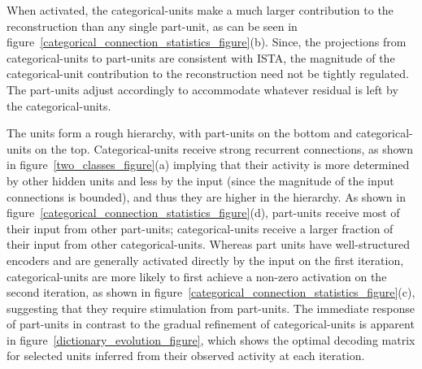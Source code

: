 \documentclass{article} %
\begin{document}
When activated, the categorical-units make a much larger contribution to the reconstruction than any single part-unit, as can be seen in figure~\ref{categorical_connection_statistics_figure}(b).  Since, the projections from categorical-units to part-units are consistent with ISTA, the magnitude of the categorical-unit contribution to the reconstruction need not be tightly regulated.  The part-units adjust accordingly to accommodate whatever residual is left by the categorical-units.

The units form a rough hierarchy, with part-units on the bottom and categorical-units on the top.  
Categorical-units receive strong recurrent connections, as shown in figure~\ref{two_classes_figure}(a) implying that their activity is more determined by other hidden units and less by the input (since the magnitude of the input connections is bounded), and thus they are higher in the hierarchy.  
As shown in figure~\ref{categorical_connection_statistics_figure}(d), part-units receive most of their input from other part-units; categorical-units receive a larger fraction of their input from other categorical-units.  %
Whereas part units have well-structured encoders and are generally activated directly by the input on the first iteration, categorical-units are more likely to first achieve a non-zero activation on the second iteration, as shown in figure~\ref{categorical_connection_statistics_figure}(c), suggesting that they require stimulation from part-units.  The immediate response of part-units in contrast to the gradual refinement of categorical-units is apparent in figure~\ref{dictionary_evolution_figure}, which shows the optimal decoding matrix for selected units inferred from their observed activity at each iteration.  %



\begin{comment}
\begin{itemize}
\item For part units (defined by classification dictionary column norm), show connected classification-unit decoders sorted by explaining-away connection magnitude and class ID
\item V plot: average explaining-away connection weight, binned by alignment between decoders, for connections from part-units to categorical-units (defined by classification dictionary column norm)
\item Show evolution of reconstructed dictionaries, prob of second-iteration activation versus categoricalness, strength of classification dictionary connection versus categoricalness
\end{itemize}
\end{comment}
\end{document}
